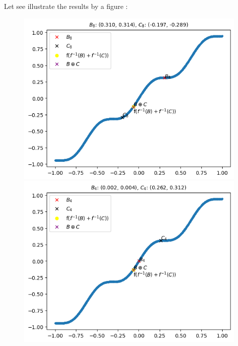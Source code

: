 \documentclass{report}
\begin{document}
            Let see illustrate the results by a figure :
            \begin{figure}[h]
                \centering
                \begin{minipage}{0.5\textwidth}
                    \centering
                    \includegraphics[width=0.9\linewidth]{./images/1.png}
                \end{minipage}%
                \begin{minipage}{0.5\textwidth}
                    \centering
                    \includegraphics[width=0.9\linewidth]{./images/2.png}
                \end{minipage}
            \end{figure}
            
\end{document}
